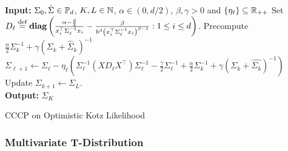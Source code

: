 \documentclass[sn-nature]{sn-jnl}%
\theoremstyle{thmstyleone}%
\theoremstyle{thmstyletwo}%
\theoremstyle{thmstylethree}%
\begin{document}
\begin{algorithm}[H]
\small 
\SetAlgoLined
\textbf{Input:} $\Sigma_0, \hat{\Sigma} \in \mathbb{P}_d$, $K, L \in \mathbb{N}$, $\alpha \in (0, d/2)$, $\beta, \gamma > 0$ and $\{\eta_\ell\} \subseteq \mathbb{R}_{++}$
\State Set $D_\ell \stackrel{\text{def}}{=} \textbf{diag}\left(\frac{\alpha - \frac{d}{2}}{x_i^\top \Sigma_\ell^{-1}x_i} - \frac{\beta}{b^\beta \left(x_i^\top \Sigma_\ell^{-1} x_i\right)^{\beta - 1}} : 1 \leq i \leq d\right)$.
 \State Precompute $\frac{n}{2}\Sigma^{-1}_k + \gamma \left(\Sigma_k + \hat{\Sigma}_k\right)^{-1}$ \\
    \State $\Sigma_{\ell+1} \leftarrow  \Sigma_\ell - \eta_\ell \left(\Sigma_{\ell}^{-1}\left( X D_\ell X^\top \right)\Sigma_\ell^{-1} - \frac{\gamma}{2}\Sigma_\ell^{-1} + \frac{n}{2}\Sigma_k^{-1} + \gamma \left(\Sigma_k+\hat{\Sigma_k}\right)^{-1}
    \right)
    $
    \State Update $\Sigma_{k+1} \leftarrow \Sigma_{L}$.\\
\textbf{Output:} $\Sigma_K$ %
 \caption{CCCP on Optimistic Kotz Likelihood} \label{alg:CCCP_on_Kotz}
\end{algorithm}

\subsubsection{Multivariate T-Distribution}
\end{document}
